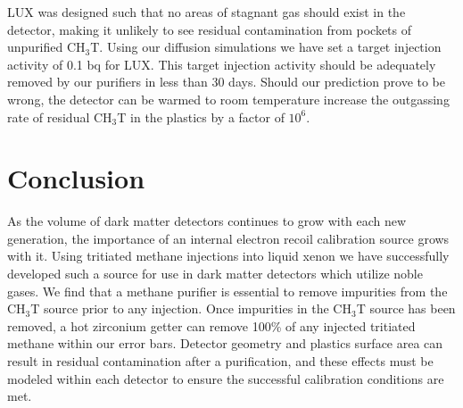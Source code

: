 \documentclass[a4paper,12pt]{article}
\begin{document}
LUX was designed such that no areas of stagnant gas should exist in the detector, making it unlikely to see residual contamination from pockets of unpurified CH$_3$T.  Using our diffusion simulations we have set a target injection activity of 0.1 bq for LUX.  This target injection activity should be adequately removed by our purifiers in less than 30 days.  Should our prediction prove to be wrong, the detector can be warmed to room temperature increase the outgassing rate of residual CH$_3$T in the plastics by a factor of $10^6$.

\section{Conclusion}

As the volume of dark matter detectors continues to grow with each new generation, the importance of an internal electron recoil calibration source grows with it.  Using tritiated methane injections into liquid xenon we have successfully developed such a source for use in dark matter detectors which utilize noble gases.  We find that a methane purifier is essential to remove impurities from the CH$_3$T source prior to any injection.  Once impurities in the CH$_3$T source has been removed, a hot zirconium getter can remove  100\% of any injected tritiated methane within our error bars.  Detector geometry and plastics surface area can result in residual contamination after a purification, and these effects must be modeled within each detector to ensure the successful calibration conditions are met.
\end{document}
